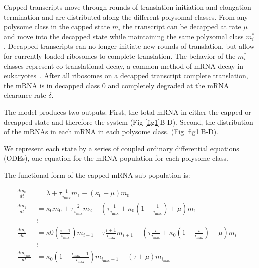 \documentclass[10pt,letterpaper]{article}
\newcommand{\imax}{\ensuremath{{i_{\max}}}\xspace}
\begin{document}
Capped transcripts move through rounds of translation initiation and elongation-termination and are distributed along the different polysomal classes. 
From any polysome class in the capped state $m_i$ the transcript can be decapped at rate $\mu$  and move into the decapped state while maintaining the same polysomal class $m_i^*$.
Decapped transcripts can no longer initiate new rounds of translation, but allow for currently loaded ribosomes to complete translation. 
The behavior of the $m_i^*$ classes represent co-translational decay, a common method of mRNA decay in eukaryotes~\cite{RN3,RN23,RN4}. 
After all ribosomes on a decapped transcript complete translation, the mRNA is in decapped class 0 and completely degraded at the mRNA clearance rate $\delta$.

The model produces two outputs. 
First, the total mRNA in either the capped or decapped state and therefore the system (Fig \ref{fig1}B-D). 
Second, the distribution of the mRNAs in each mRNA in each polysome class. (Fig \ref{fig1}B-D).

We represent each state by a series of coupled ordinary differential equations (ODEs), one equation for the mRNA population for each polysome class. 

The functional form of the capped mRNA sub population is:


\begin{strip}
\begin{align} \label{eq:Capped_ODE}
\frac{dm_{0}}{dt} &= \lambda+ \tau \frac{1}{\imax}m_{1}-\left(\kappa_0 + \mu\right)m_{0} \nonumber \\
\frac{dm_{1}}{dt} &= \kappa_0 m_{0}+ \tau \frac{2}{\imax}m_{2}-\left( \tau \frac{1}{\imax}+\kappa_0\left(1-\frac{1}{\imax}\right)+\mu\right) m_{1}\nonumber \\
& \vdots & \nonumber \\
\frac{dm_{i}}{dt} &= \kappa0 \left(\frac{i-1}{\imax}\right) m_{i-1}+ \tau \frac{i+1}{\imax}m_{i+1}-\left( \tau \frac{i}{\imax}+\kappa_0\left(1-\frac{i}{\imax}\right)+\mu\right) m_{i} \nonumber \\
& \vdots & \nonumber \\
\frac{dm_{\imax}}{dt} &= \kappa_0\left(1-\frac{\imax-1}{\imax}\right)m_{\imax-1}-\left( \tau +\mu\right) m_{\imax}
\end{align}
\end{strip}
\end{document}

